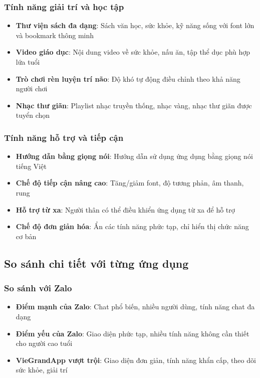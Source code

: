 \documentclass[12pt,a4paper]{article}
\begin{document}
\subsubsection{Tính năng giải trí và học tập}
\begin{itemize}[leftmargin=2cm]
    \item \textbf{Thư viện sách đa dạng}: Sách văn học, sức khỏe, kỹ năng sống với font lớn và bookmark thông minh
    \item \textbf{Video giáo dục}: Nội dung video về sức khỏe, nấu ăn, tập thể dục phù hợp lứa tuổi
    \item \textbf{Trò chơi rèn luyện trí não}: Độ khó tự động điều chỉnh theo khả năng người chơi
    \item \textbf{Nhạc thư giãn}: Playlist nhạc truyền thống, nhạc vàng, nhạc thư giãn được tuyển chọn
\end{itemize}

\subsubsection{Tính năng hỗ trợ và tiếp cận}
\begin{itemize}[leftmargin=2cm]
    \item \textbf{Hướng dẫn bằng giọng nói}: Hướng dẫn sử dụng ứng dụng bằng giọng nói tiếng Việt
    \item \textbf{Chế độ tiếp cận nâng cao}: Tăng/giảm font, độ tương phản, âm thanh, rung
    \item \textbf{Hỗ trợ từ xa}: Người thân có thể điều khiển ứng dụng từ xa để hỗ trợ
    \item \textbf{Chế độ đơn giản hóa}: Ẩn các tính năng phức tạp, chỉ hiển thị chức năng cơ bản
\end{itemize}

\subsection{So sánh chi tiết với từng ứng dụng}

\subsubsection{So sánh với Zalo}
\begin{itemize}[leftmargin=2cm]
    \item \textbf{Điểm mạnh của Zalo}: Chat phổ biến, nhiều người dùng, tính năng chat đa dạng
    \item \textbf{Điểm yếu của Zalo}: Giao diện phức tạp, nhiều tính năng không cần thiết cho người cao tuổi
    \item \textbf{VieGrandApp vượt trội}: Giao diện đơn giản, tính năng khẩn cấp, theo dõi sức khỏe, giải trí
\end{itemize}
\end{document}
